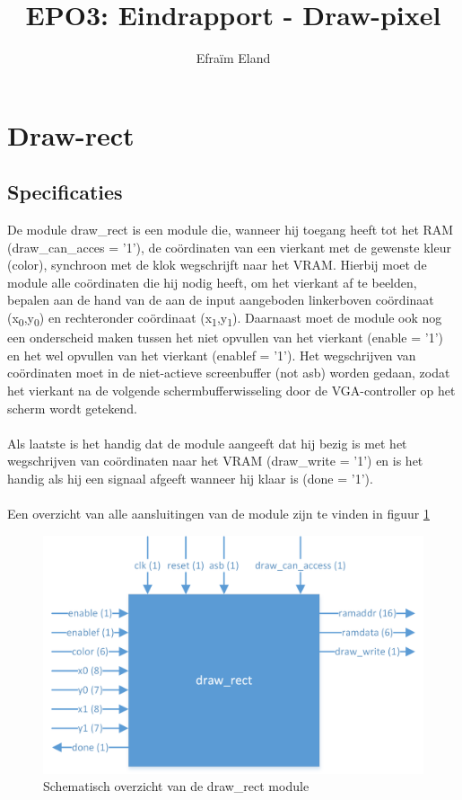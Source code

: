 \documentclass{scrartcl} %
\author{Efraïm Eland}%
\title{EPO3: Eindrapport - Draw-pixel}
\begin{document}
\section{Draw-rect} %
\label{sec:draw-rect}  %

\newcommand{\tss}{\textsubscript}

\subsection{Specificaties}
De module draw\_rect is een module die, wanneer hij toegang heeft tot het RAM (draw\_can\_acces = '1'), de coördinaten van een vierkant met de gewenste kleur (color), synchroon met de klok wegschrijft naar het VRAM. Hierbij moet de module alle coördinaten die hij nodig heeft, om het vierkant af te beelden, bepalen aan de hand van de aan de input aangeboden linkerboven coördinaat (x\tss{0},y\tss{0}) en rechteronder coördinaat (x\tss{1},y\tss{1}). Daarnaast moet de module ook nog een onderscheid maken tussen het niet opvullen van het vierkant (enable = '1') en het wel opvullen van het vierkant (enablef = '1'). Het wegschrijven van coördinaten moet in de niet-actieve screenbuffer (not asb) worden gedaan, zodat het vierkant na de volgende schermbufferwisseling door de VGA-controller op het scherm wordt getekend.
\\\\
Als laatste is het handig dat de module aangeeft dat hij bezig is met het wegschrijven van coördinaten naar het VRAM (draw\_write = '1') en is het handig als hij een signaal afgeeft wanneer hij klaar is (done = '1').
\\\\
Een overzicht van alle aansluitingen van de module zijn te vinden in figuur \ref{fig:draw_rect}

\begin{figure}[H]
	\centering
	\includegraphics[width=\textwidth]{resources/draw_rect.png}
	\caption{Schematisch overzicht van de draw_rect module}
	\label{fig:draw_rect}
\end{figure}
\end{document}

